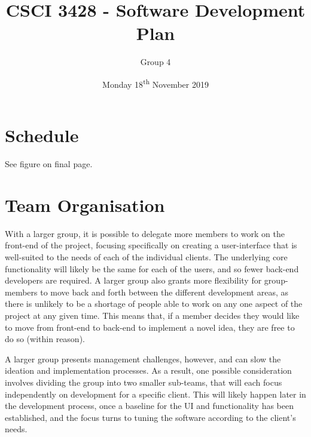 \documentclass[11pt]{article}
\renewcommand{\headrulewidth}{.3pt}
\renewcommand{\footrulewidth}{.3pt}
\begin{document}
\title{CSCI 3428 - Software Development Plan}
\author{Group 4}
\date{Monday 18\textsuperscript{th} November 2019}
\maketitle

\fancypagestyle{plain}{
\fancyhf{} %
\fancyfoot[r]{\footnotesize \thepage} %
\fancyfoot[l]{\small\scshape SDP}
\renewcommand{\headrulewidth}{0pt}
\renewcommand{\footrulewidth}{.3pt}}

\section{Schedule}

See figure on final page.

\section{Team Organisation}
With a larger group, it is possible to delegate more members to work on the front-end of the project,
focusing specifically on creating a user-interface that is well-suited to the needs of each of the
individual clients. The underlying core functionality will likely be the same for each of the users,
and so fewer back-end developers are required. A larger group also grants more flexibility for
group-members to move back and forth between the different development areas, as there is unlikely
to be a shortage of people able to work on any one aspect of the project at any given time. This
means that, if a member decides they would like to move from front-end to back-end to implement a
novel idea, they are free to do so (within reason).

A larger group presents management challenges, however, and can slow the ideation and implementation
processes. As a result, one possible consideration involves dividing the group into two smaller
sub-teams, that will each focus independently on development for a specific client. This will likely
happen later in the development process, once a baseline for the UI and functionality has been
established, and the focus turns to tuning the software according to the client’s needs.
\end{document}
